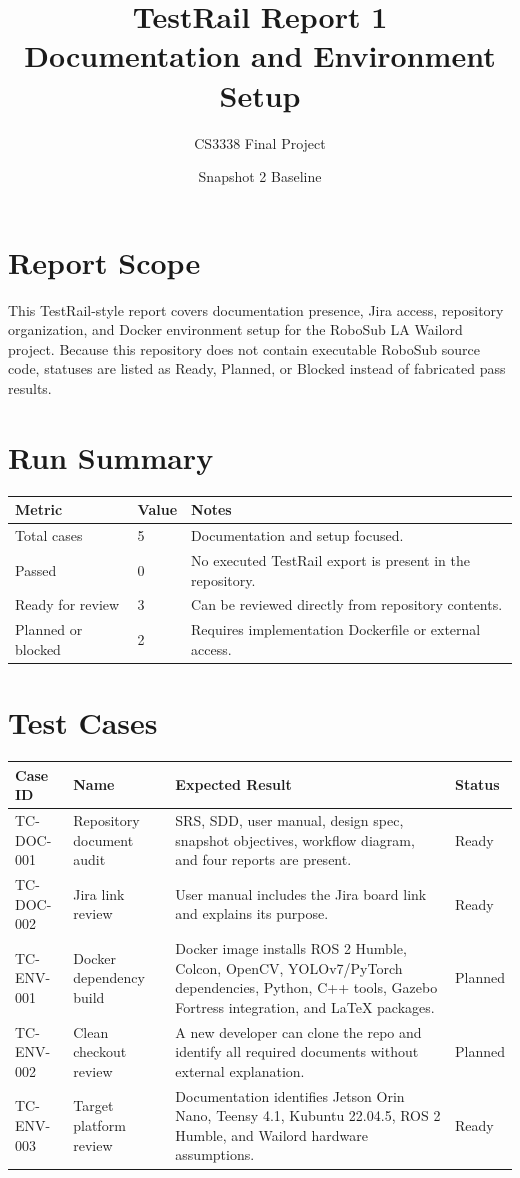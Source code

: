 \documentclass[12pt]{article}
\title{TestRail Report 1\\Documentation and Environment Setup}
\author{CS3338 Final Project}
\date{Snapshot 2 Baseline}
\begin{document}
\maketitle

\section{Report Scope}
This TestRail-style report covers documentation presence, Jira access, repository organization, and Docker environment setup for the RoboSub LA Wailord project. Because this repository does not contain executable RoboSub source code, statuses are listed as Ready, Planned, or Blocked instead of fabricated pass results.

\section{Run Summary}
\begin{longtable}{|p{}|p{}|p{}|}
\hline
\textbf{Metric} & \textbf{Value} & \textbf{Notes} \\
\hline
Total cases & 5 & Documentation and setup focused. \\
\hline
Passed & 0 & No executed TestRail export is present in the repository. \\
\hline
Ready for review & 3 & Can be reviewed directly from repository contents. \\
\hline
Planned or blocked & 2 & Requires implementation Dockerfile or external access. \\
\hline
\end{longtable}

\section{Test Cases}
\begin{longtable}{|p{}|p{}|p{}|p{}|}
\hline
\textbf{Case ID} & \textbf{Name} & \textbf{Expected Result} & \textbf{Status} \\
\hline
TC-DOC-001 & Repository document audit & SRS, SDD, user manual, design spec, snapshot objectives, workflow diagram, and four reports are present. & Ready \\
\hline
TC-DOC-002 & Jira link review & User manual includes the Jira board link and explains its purpose. & Ready \\
\hline
TC-ENV-001 & Docker dependency build & Docker image installs ROS 2 Humble, Colcon, OpenCV, YOLOv7/PyTorch dependencies, Python, C++ tools, Gazebo Fortress integration, and LaTeX packages. & Planned \\
\hline
TC-ENV-002 & Clean checkout review & A new developer can clone the repo and identify all required documents without external explanation. & Planned \\
\hline
TC-ENV-003 & Target platform review & Documentation identifies Jetson Orin Nano, Teensy 4.1, Kubuntu 22.04.5, ROS 2 Humble, and Wailord hardware assumptions. & Ready \\
\hline
\end{longtable}
\end{document}
